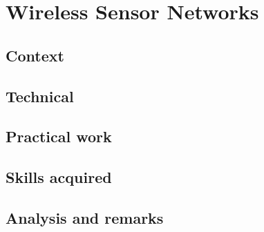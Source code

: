 \section{Wireless Sensor Networks}
\subsection{Context}
\subsection{Technical}
\subsection{Practical work}
\subsection{Skills acquired}
\subsection{Analysis and remarks}